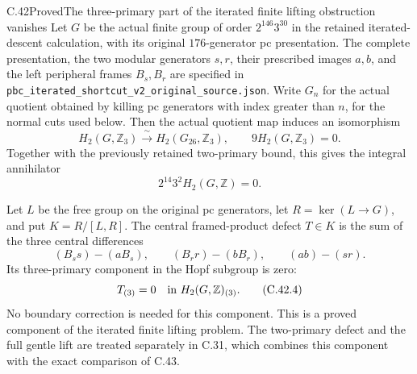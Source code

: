 \begin{statement}{C.42}{Proved}{The three-primary part of the iterated finite lifting obstruction vanishes}
Let $G$ be the actual finite group of order $2^{146}3^{30}$ in the
retained iterated-descent calculation, with its original $176$-generator
pc presentation.  The complete presentation, the two modular generators
$s,r$, their prescribed images $a,b$, and the left peripheral frames
$B_s,B_r$ are specified in
\texttt{pbc\_iterated\_shortcut\_v2\_original\_source.json}.
Write $G_n$ for the actual quotient obtained by killing pc generators
with index greater than $n$, for the normal cuts used below.
Then the actual quotient map induces an isomorphism
\[
 H_2(G,\mathbb Z_3)\xrightarrow{\ \sim\ }H_2(G_{26},\mathbb Z_3),
 \qquad 9H_2(G,\mathbb Z_3)=0.
 \tag{C.42.1}
\]
Together with the previously retained two-primary bound, this gives the
integral annihilator
\[
                 2^{14}3^2H_2(G,\mathbb Z)=0.
 \tag{C.42.2}
\]

Let $L$ be the free group on the original pc generators, let
$R=\ker(L\to G)$, and put $K=R/[L,R]$.  The central framed-product
defect $T\in K$ is the sum of the three central differences
\[
 (B_ss)-(aB_s),\qquad (B_rr)-(bB_r),\qquad (ab)-(sr).
 \tag{C.42.3}
\]
Its three-primary component in the Hopf subgroup is zero:
\[
                T_{(3)}=0\quad\hbox{in }H_2(G,\mathbb Z)_{(3)}.
 \tag{C.42.4}
\]
No boundary correction is needed for this component.
This is a proved component of the iterated finite lifting problem.
The two-primary defect and the full gentle lift are treated separately
in C.31, which combines this component with the exact comparison of C.43.
\end{statement}
